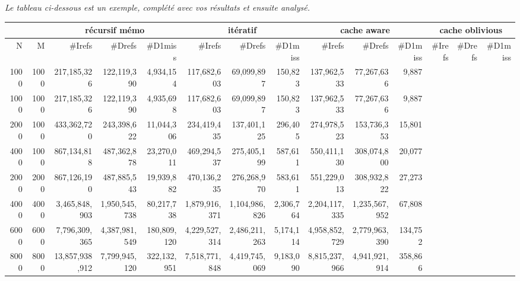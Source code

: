 \documentclass[10pt,a4paper]{article}
\begin{document}
{\em Le tableau ci-dessous est un exemple,  complété avec vos résultats et 
ensuite analysé.}
\\
{\footnotesize

\begin{tabular}{|r|r||r|r|r||r|r|r||r|r|r||r|r|r||}
\hline
 \multicolumn{2}{|c||}{ } 
& \multicolumn{3}{c||}{récursif mémo}
& \multicolumn{3}{c||}{itératif}
& \multicolumn{3}{c||}{cache aware}
& \multicolumn{3}{c||}{cache oblivious}
\\ \hline
N & M 
& \#Irefs & \#Drefs & \#D1miss %
& \#Irefs & \#Drefs & \#D1miss %
& \#Irefs & \#Drefs & \#D1miss %
& \#Irefs & \#Drefs & \#D1miss %
\\ \hline
\hline
1000 & 1000 
&217,185,326  &122,119,390  &4,934,154   %
&117,682,603  &69,099,897  &150,823   %
&137,962,533  &77,267,636  &9,887   %
&  &  &   %
\\ \hline
1000 & 1000 
& 217,185,326  & 122,119,390  & 4,935,698   %
& 117,682,603  & 69,099,897  & 150,823   %
& 137,962,533  & 77,267,636  & 9,887   %
&  &  &   %
\\ \hline
2000 & 1000 
& 433,362,720  & 243,398,622  & 11,044,306   %
& 234,419,435  & 137,401,125  & 296,405   %
& 274,978,523  & 153,736,353  & 15,801   %
&  &  &   %
\\ \hline
4000 & 1000 
& 867,134,818  & 487,362,878  & 23,270,011   %
& 469,294,537  & 275,405,199  & 587,611   %
& 550,411,130  & 308,074,800  & 20,077   %
&  &  &   %
\\ \hline
2000 & 2000 
& 867,126,190  & 487,885,543  & 19,939,882   %
& 470,136,235  & 276,268,970  & 583,611   %
& 551,229,013  & 308,932,822  & 27,273    %
&  &  &   %
\\ \hline
4000 & 4000
& 3,465,848,903  & 1,950,545,738  & 80,217,738   %
& 1,879,916,371  & 1,104,986,826  & 2,306,764   %
& 2,204,117,335  & 1,235,567,952  & 67,808   %
&  &  &   %
\\ \hline
6000 & 6000 
& 7,796,309,365  & 4,387,981,549  & 180,809,120   %
& 4,229,527,314  & 2,486,211,263  & 5,174,114   %
& 4,958,852,729 & 2,779,963,390 & 134,752  %
&  &  &   %
\\ \hline
8000 & 8000
& 13,857,938,912  & 7,799,945,120  & 322,132,951   %
& 7,518,771,848  & 4,419,745,069  & 9,183,090   %
& 8,815,237,966  & 4,941,921,914  & 358,866   %
&  &  &   %
\\ \hline
\hline
\end{tabular}
}
\end{document}

